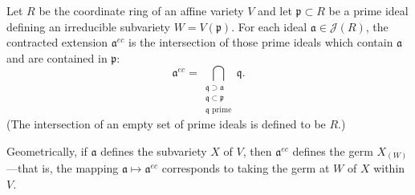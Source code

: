 Let $R$ be the coordinate ring of an affine variety $V$ and let $\mathfrak{p} \subset R$ be a prime ideal defining an irreducible subvariety $W = V(\mathfrak{p})$. For each ideal $\mathfrak{a} \in \mathcal{J}(R)$, the contracted extension $\mathfrak{a}^{ec}$ is the intersection of those prime ideals which contain $\mathfrak{a}$ and are contained in $\mathfrak{p}$:
$$\mathfrak{a}^{ec} = \bigcap_{\substack{\mathfrak{q} \supset \mathfrak{a} \\ \mathfrak{q} \subset \mathfrak{p} \\ \mathfrak{q} \text{ prime}}} \mathfrak{q}.$$
(The intersection of an empty set of prime ideals is defined to be $R$.)

Geometrically, if $\mathfrak{a}$ defines the subvariety $X$ of $V$, then $\mathfrak{a}^{ec}$ defines the germ $X_{(W)}$—that is, the mapping $\mathfrak{a} \mapsto \mathfrak{a}^{ec}$ corresponds to taking the germ at $W$ of $X$ within $V$.
